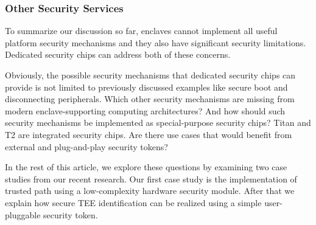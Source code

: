 \subsubsection*{Other Security Services}

To summarize our discussion so far, enclaves cannot implement all useful platform security mechanisms and they also have significant security limitations. Dedicated security chips can address both of these concerns. 

Obviously, the possible security mechanisms that dedicated security chips can provide is not limited to previously discussed examples like secure boot and disconnecting peripherals. Which other security mechanisms are missing from modern enclave-supporting computing architectures? And how should such security mechanisms be implemented as special-purpose security chips? Titan and T2 are integrated security chips. Are there use cases that would benefit from external and plug-and-play security tokens?

In the rest of this article, we explore these questions by examining two case studies from our recent research. Our first case study is the implementation of trusted path using a low-complexity hardware security module. After that we explain how secure TEE identification can be realized using a simple user-pluggable security token.

